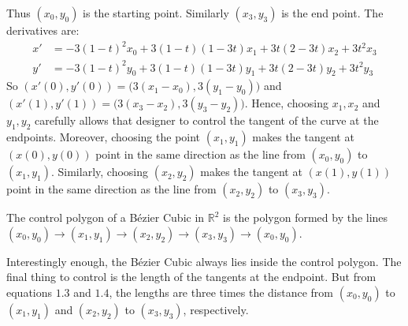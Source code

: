 \documentclass[crop=false,class=article,oneside]{standalone}
\begin{document}
            Thus $(x_0,y_0)$ is the starting point.
            Similarly $(x_3,y_3)$ is the end point.
            The derivatives are:
            \begin{align*}
                x'&=-3(1-t)^2x_0
                   +3(1-t)(1-3t)x_1
                   +3t(2-3t)x_2
                   +3t^2x_3 \\
                y'&=-3(1-t)^2y_0
                   +3(1-t)(1-3t)y_1
                   +3t(2-3t)y_2
                   +3t^2y_3
            \end{align*}
            So $(x'(0),y'(0))=\big(3(x_1-x_0),3(y_1-y_0)\big)$
            and $(x'(1),y'(1))=\big(3(x_3-x_2),3(y_3-y_2)\big)$.
            Hence, choosing $x_1,x_2$ and $y_1,y_2$ carefully
            allows that designer to control the tangent of the
            curve at the endpoints. Moreover, choosing the point
            $(x_1,y_1)$ makes the tangent at $(x(0),y(0))$ point
            in the same direction as the line from $(x_0,y_0)$
            to $(x_1,y_1)$. Similarly, choosing $(x_2,y_2)$ makes
            the tangent at $(x(1),y(1))$ point in the same
            direction as the line from
            $(x_2,y_2)$ to $(x_3,y_3)$.
            \begin{definition}
                The control polygon of a B\'{e}zier Cubic
                in $\mathbb{R}^2$ is the polygon formed
                by the lines
                $(x_0,y_0)\rightarrow(x_1,y_1)%
                 \rightarrow(x_2,y_2)\rightarrow(x_3,y_3)%
                 \rightarrow (x_0,y_0)$.
            \end{definition}
            Interestingly enough, the B\'{e}zier Cubic always
            lies inside the control polygon. The final thing
            to control is the length of the tangents at the
            endpoint. But from equations $1.3$ and $1.4$, the
            lengths are three times the distance from
            $(x_0,y_0)$ to $(x_1,y_1)$ and $(x_2,y_2)$ to
            $(x_3,y_3)$, respectively. 
\end{document}
